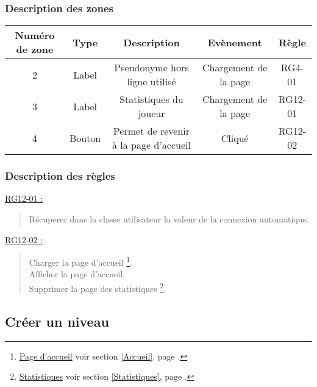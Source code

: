 \documentclass{report}
\begin{document}
		\subsubsection{Description des zones}
		
			\begin{tabular}{|c|c|c|c|c|} \hline
				Numéro de zone & Type  & Description & Evènement &	Règle \\\hline
				2 & Label & Pseudonyme hors ligne utilisé & Chargement de la page & RG4-01 \\\hline
				3 & Label & Statistiques du joueur & Chargement de la page & RG12-01 \\\hline
				4 & Bouton & Permet de revenir à la page d'accueil & Cliqué & RG12-02 \\\hline 
			\end{tabular}
			
		\subsubsection{Description des règles}

			\underline{RG12-01 :}
				\begin{quote}
					Récuperer dans la classe utilisateur la valeur de la connexion automatique.\\
				\end{quote}
				
			\underline{RG12-02 :}
				\begin{quote}
					Charger la page d'accueil%
						\footnote[3]{
							\hyperlink{Page d'accueil}{Page d'accueil}
							\og voir section \ref{Accueil}, page \pageref{Accueil}.\fg
						}.\\
					Afficher la page d'accueil\footnotemark[3].\\
					Supprimer la page des statistiques%
						\footnote[2]{
							\hyperlink{Statistiques}{Statistiques}
							\og voir section \ref{Statistiques}, page \pageref{Statistiques}.\fg
						}.\\		
				\end{quote}
				
				
\newpage
	
	\subsection{Créer un niveau}
		
		\hypertarget{Creer niveau}{}
		\label{Creer niveau}
			
		\begin{center}
			
		\end{center}
\end{document}
